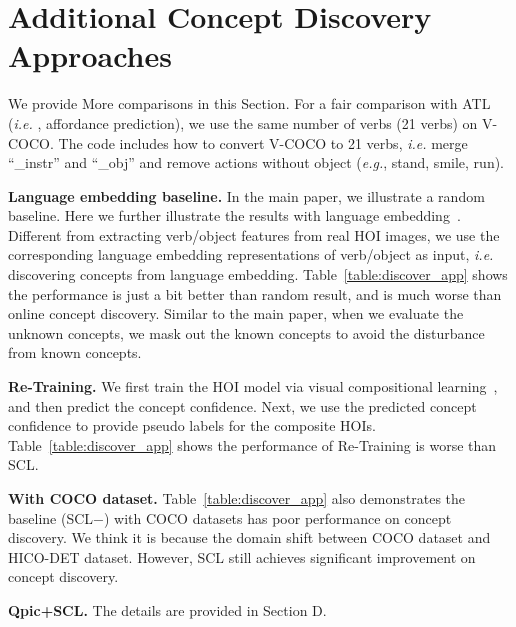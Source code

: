 \documentclass[runningheads]{llncs}
\newcommand{\ie}{\textit{i.e. }}
\newcommand{\eg}{\textit{e.g.}}
\begin{document}
\section{Additional Concept Discovery Approaches}
\label{sec:cd_exp}

We provide More comparisons in this Section. For a fair comparison with ATL~\cite{hou2021atl} (\ie, affordance prediction), we use the same number of verbs (21 verbs) on V-COCO. The code includes how to convert V-COCO to 21 verbs, \ie merge ``\_instr'' and ``\_obj'' and remove actions without object (\eg, stand, smile, run). 

{\bf Language embedding baseline.} In the main paper, we illustrate a random baseline. Here we further illustrate the results with language embedding~\cite{pennington2014glove}. Different from extracting verb/object features from real HOI images, we use the corresponding language embedding representations of verb/object as input, \ie discovering concepts from language embedding. Table~\ref{table:discover_app} shows the performance is just a bit better than random result, and is much worse than online concept discovery. Similar to the main paper, when we evaluate the unknown concepts, we mask out the known concepts to avoid the disturbance from known concepts.

{\bf Re-Training.} We first train the HOI model via visual compositional learning~\cite{hou2020visual}, and then predict the concept confidence. Next, we use the predicted concept confidence to provide pseudo labels for the composite HOIs. Table~\ref{table:discover_app} shows the performance of Re-Training is worse than SCL. 

{\bf With COCO dataset.} Table~\ref{table:discover_app} also demonstrates the baseline (SCL$-$) with COCO datasets has poor performance on concept discovery. We think it is because the domain shift between COCO dataset and HICO-DET dataset. However, SCL still achieves significant improvement on concept discovery.

{\bf Qpic+SCL.} The details are provided in Section D.
\end{document}
